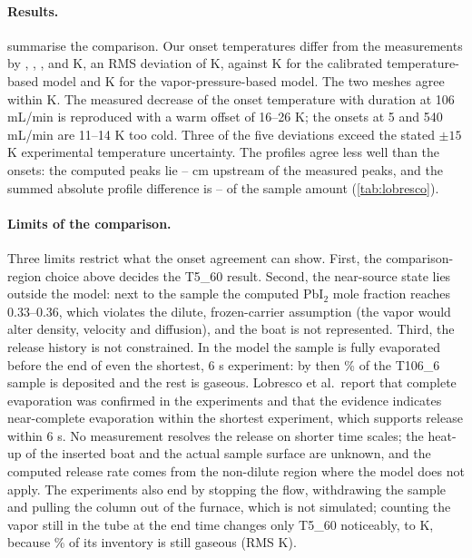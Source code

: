\paragraph{Results.}  summarise the
comparison. Our onset temperatures differ from the measurements by
\LobDiffA, \LobDiffB, \LobDiffC, \LobDiffD{} and \LobDiffE{} K, an RMS
deviation of \LobRMS{} K, against \LobRMSTemp{} K for the calibrated
temperature-based model and \LobRMSVap{} K for the vapor-pressure-based
model. The two meshes agree within \LobCoarse{} K. The measured decrease
of the onset temperature with duration at 106 mL/min is reproduced with
a warm offset of 16--26 K; the onsets at 5 and 540 mL/min are 11--14 K
too cold. Three of the five deviations exceed the stated $\pm15$ K
experimental temperature uncertainty. The profiles agree less well than
the onsets: the computed peaks lie \LobShiftMin--\LobShiftMax{} cm
upstream of the measured peaks, and the summed absolute profile
difference is \LobLOneMin--\LobLOneMax{} of the sample amount
(\cref{tab:lobresco}).

\paragraph{Limits of the comparison.} Three limits restrict what the
onset agreement can show. First, the comparison-region choice above
decides the T5\_60 result. Second, the near-source state lies outside
the model: next to the sample the computed PbI$_2$ mole fraction
reaches 0.33--0.36, which violates the dilute, frozen-carrier
assumption (the vapor would alter density, velocity and diffusion),
and the boat is not represented. Third, the release history is not
constrained. In the model the sample is fully evaporated before the end
of even the shortest, 6 s experiment: by then \LobSixDeposit\% of the T106\_6
sample is deposited and the rest is gaseous. Lobresco et al.\ report
that complete evaporation was confirmed in the experiments and that the
evidence indicates near-complete evaporation within the shortest
experiment, which supports release within 6 s. No measurement resolves
the release on shorter time scales; the heat-up of the inserted boat
and the actual sample surface are unknown, and the computed release
rate comes from the non-dilute region where the model does not apply.
The experiments also end by stopping the flow, withdrawing the sample
and pulling the column out of the furnace, which is not simulated;
counting the vapor still in the tube at the end time changes only
T5\_60 noticeably, to \LobFiveGas{} K, because \LobFiveGasFraction\% of
its inventory is still gaseous (RMS \LobRMSGas{} K).

